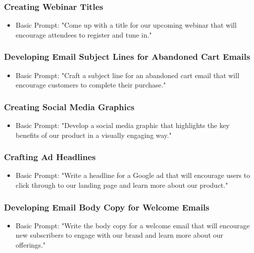 \begin{frame}[fragile]\frametitle{Creating Webinar Titles}
\begin{itemize}
\item Basic Prompt: "Come up with a title for our upcoming webinar that will encourage attendees to register and tune in."
\end{itemize}
\end{frame}

\begin{frame}[fragile]\frametitle{Developing Email Subject Lines for Abandoned Cart Emails}
\begin{itemize}
\item Basic Prompt: "Craft a subject line for an abandoned cart email that will encourage customers to complete their purchase."
\end{itemize}
\end{frame}

\begin{frame}[fragile]\frametitle{Creating Social Media Graphics}
\begin{itemize}
\item Basic Prompt: "Develop a social media graphic that highlights the key benefits of our product in a visually engaging way."
\end{itemize}
\end{frame}

\begin{frame}[fragile]\frametitle{Crafting Ad Headlines}
\begin{itemize}
\item Basic Prompt: "Write a headline for a Google ad that will encourage users to click through to our landing page and learn more about our product."
\end{itemize}
\end{frame}

\begin{frame}[fragile]\frametitle{Developing Email Body Copy for Welcome Emails}
\begin{itemize}
\item Basic Prompt: "Write the body copy for a welcome email that will encourage new subscribers to engage with our brand and learn more about our offerings."
\end{itemize}
\end{frame}

